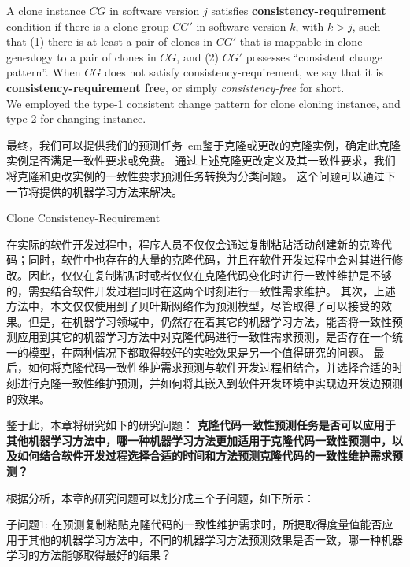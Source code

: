 \begin{definition} 
A clone instance $CG$ in software version $j$ satisfies {\bf consistency-requirement\/} condition if there is a clone group $CG'$ in software version $k$, with $k>j$, such that (1) there is at least a pair of clones in $CG'$ that is mappable in clone genealogy to a pair of clones in $CG$, and (2) $CG'$ possesses ``consistent change pattern''. When $CG$ does not satisfy consistency-requirement, we say that it is {\bf consistency-requirement free\/}, or simply {\em consistency-free\/} for short. \\
We employed the type-1 consistent change pattern for clone cloning instance, and type-2 for changing instance.
\end{definition}

最终，我们可以提供我们的预测任务{\ em鉴于克隆或更改的克隆实例，确定此克隆实例是否满足一致性要求或免费。 }
通过上述克隆更改定义及其一致性要求，我们将克隆和更改实例的一致性要求预测任务转换为分类问题。
这个问题可以通过下一节将提供的机器学习方法来解决。



{Clone Consistency-Requirement}

在实际的软件开发过程中，程序人员不仅仅会通过复制粘贴活动创建新的克隆代码；同时，软件中也存在的大量的克隆代码，并且在软件开发过程中会对其进行修改。因此，仅仅在复制粘贴时或者仅仅在克隆代码变化时进行一致性维护是不够的，需要结合软件开发过程同时在这两个时刻进行一致性需求维护。
其次，上述方法中，本文仅仅使用到了贝叶斯网络作为预测模型，尽管取得了可以接受的效果。但是，在机器学习领域中，仍然存在着其它的机器学习方法，能否将一致性预测应用到其它的机器学习方法中对克隆代码进行一致性需求预测，是否存在一个统一的模型，在两种情况下都取得较好的实验效果是另一个值得研究的问题。
最后，如何将克隆代码一致性维护需求预测与软件开发过程相结合，并选择合适的时刻进行克隆一致性维护预测，并如何将其嵌入到软件开发环境中实现边开发边预测的效果。

鉴于此，本章将研究如下的研究问题：
{\bf 克隆代码一致性预测任务是否可以应用于其他机器学习方法中，哪一种机器学习方法更加适用于克隆代码一致性预测中，以及如何结合软件开发过程选择合适的时间和方法预测克隆代码的一致性维护需求预测？}

根据分析，本章的研究问题可以划分成三个子问题，如下所示：

子问题1: 在预测复制粘贴克隆代码的一致性维护需求时，所提取得度量值能否应用于其他的机器学习方法中，不同的机器学习方法预测效果是否一致，哪一种机器学习的方法能够取得最好的结果？

